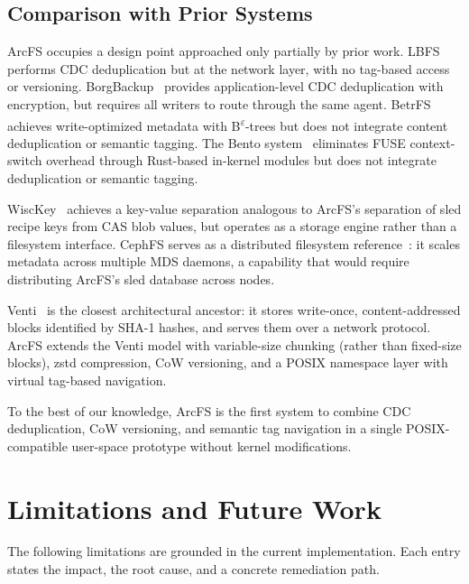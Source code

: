 \documentclass[journal]{IEEEtran}
\begin{document}
\subsection{Comparison with Prior Systems}

ArcFS occupies a design point approached only partially by prior work.
LBFS~\cite{muthitacharoen2001lbfs} performs CDC deduplication but at the
network layer, with no tag-based access or versioning.
BorgBackup~\cite{borgbackup2024} provides application-level CDC
deduplication with encryption, but requires all writers to route through
the same agent. BetrFS~\cite{jannen2015betrfs} achieves write-optimized
metadata with B\textsuperscript{$\varepsilon$}-trees but does not integrate
content deduplication or semantic tagging. The Bento
system~\cite{miller2021bento} eliminates FUSE context-switch overhead
through Rust-based in-kernel modules but does not integrate deduplication
or semantic tagging.

WiscKey~\cite{lu2017wisckey} achieves a key-value separation analogous to
ArcFS's separation of sled recipe keys from CAS blob values, but operates
as a storage engine rather than a filesystem interface.  CephFS
serves as a distributed filesystem reference~\cite{weil2006ceph}: it scales
metadata across multiple MDS daemons, a capability that would require
distributing ArcFS's sled database across nodes.

Venti~\cite{quinlan2002venti} is the closest architectural ancestor: it
stores write-once, content-addressed blocks identified by SHA-1 hashes,
and serves them over a network protocol.  ArcFS extends the Venti model
with variable-size chunking (rather than fixed-size blocks), zstd
compression, CoW versioning, and a POSIX namespace layer with virtual
tag-based navigation.

To the best of our knowledge, ArcFS is the first system to combine
CDC deduplication, CoW versioning, and semantic tag navigation in a
single POSIX-compatible user-space prototype without kernel
modifications.

\section{Limitations and Future Work}
\label{sec:limits}

The following limitations are grounded in the current implementation.
Each entry states the impact, the root cause, and a concrete remediation
path.
\end{document}
